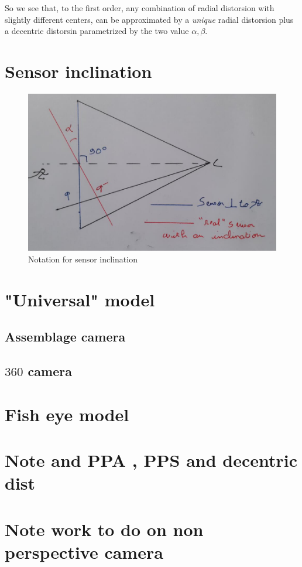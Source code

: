 So we see that, to the first order, any combination of radial distorsion with slightly different centers,
can be approximated by a \emph{unique} radial distorsion plus a decentric distorsin parametrized by the two value $\alpha,\beta$.




\section{Sensor inclination}

\begin{figure}
\centering
\includegraphics[width=12cm]{Methods/Images/PlanIncl.jpg}\caption{Notation for sensor inclination}
	\label{fig:PlaneIncl}
\end{figure}



\section{"Universal" model}

\subsection{Assemblage camera}
\subsection{$360$ camera}

\section{Fish eye model}
\label{SecFE}

\section{Note and PPA , PPS and decentric dist}
\label{PPA:PPS:DEC}


\section{Note work to do on non perspective camera}








